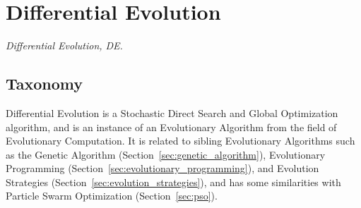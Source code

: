 

\section{Differential Evolution} 
\label{sec:differential_evolution}

\emph{Differential Evolution, DE.}

\subsection{Taxonomy}
Differential Evolution is a Stochastic Direct Search and Global Optimization algorithm, and is an instance of an Evolutionary Algorithm from the field of Evolutionary Computation.
It is related to sibling Evolutionary Algorithms such as the Genetic Algorithm (Section~\ref{sec:genetic_algorithm}), Evolutionary Programming (Section~\ref{sec:evolutionary_programming}), and Evolution Strategies (Section~\ref{sec:evolution_strategies}), and has some similarities with Particle Swarm Optimization (Section~\ref{sec:pso}).

